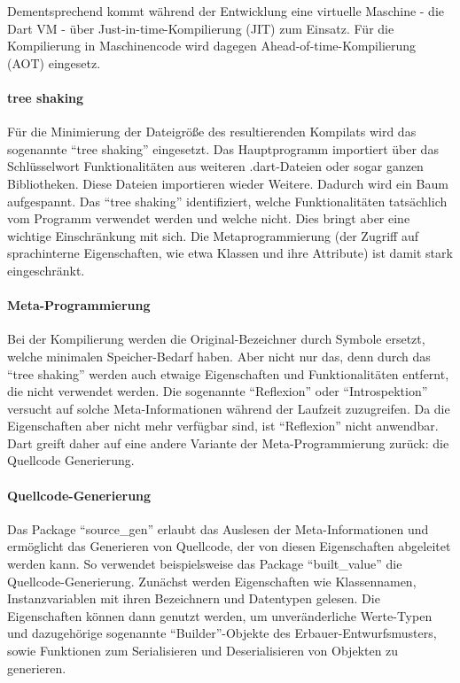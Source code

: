 Dementsprechend kommt während der Entwicklung eine virtuelle Maschine - die Dart VM - über Just-in-time-Kompilierung (JIT) zum Einsatz.
Für die Kompilierung in Maschinencode wird dagegen Ahead-of-time-Kompilierung (AOT) eingesetz.

\paragraph{tree shaking}
Für die Minimierung der Dateigröße des resultierenden Kompilats wird das sogenannte \enquote{tree shaking} eingesetzt.
Das Hauptprogramm importiert über das Schlüsselwort  Funktionalitäten aus  weiteren .dart-Dateien oder sogar ganzen Bibliotheken.
Diese Dateien importieren wieder Weitere.
Dadurch wird ein Baum aufgespannt.
Das \enquote{tree shaking} identifiziert, welche Funktionalitäten tatsächlich vom Programm verwendet werden und welche nicht.
Dies bringt aber eine wichtige Einschränkung mit sich.
Die Metaprogrammierung (der Zugriff auf sprachinterne Eigenschaften, wie etwa Klassen und ihre Attribute) ist damit stark eingeschränkt.

\paragraph{Meta-Programmierung}
Bei der Kompilierung werden die Original-Bezeichner durch Symbole ersetzt, welche minimalen Speicher-Bedarf haben.
Aber nicht nur das, denn durch das \enquote{tree shaking} werden auch etwaige Eigenschaften und Funktionalitäten entfernt, die nicht verwendet werden.
Die sogenannte \enquote{Reflexion} oder \enquote{Introspektion} versucht auf solche Meta-Informationen während der Laufzeit zuzugreifen.
Da die Eigenschaften aber nicht mehr verfügbar sind, ist \enquote{Reflexion} nicht anwendbar.
Dart greift daher auf eine andere Variante der Meta-Programmierung zurück: die Quellcode Generierung.

\paragraph{Quellcode-Generierung}
Das Package \enquote{source_gen} erlaubt das Auslesen der Meta-Informationen und ermöglicht das Generieren von Quellcode, der von diesen Eigenschaften abgeleitet werden kann.
So verwendet beispielsweise das Package \enquote{built_value} die Quellcode-Generierung.
Zunächst werden Eigenschaften wie Klassennamen, Instanzvariablen mit ihren Bezeichnern und Datentypen gelesen.
Die Eigenschaften können dann genutzt werden, um unveränderliche Werte-Typen und dazugehörige sogenannte \enquote{Builder}-Objekte des Erbauer-Entwurfsmusters, sowie Funktionen zum Serialisieren und Deserialisieren von Objekten zu generieren.

